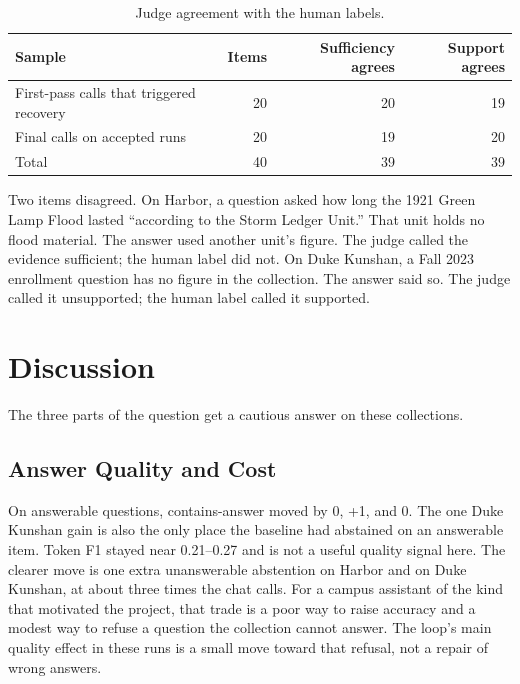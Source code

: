 \documentclass[12pt, a4paper, oneside]{report}
\begin{document}
\begin{table}[htbp]
\centering
\footnotesize
\begin{tabular}{@{}lrrr@{}}
\toprule
Sample & Items & Sufficiency agrees & Support agrees \\
\midrule
First-pass calls that triggered recovery & 20 & 20 & 19 \\
Final calls on accepted runs & 20 & 19 & 20 \\
\midrule
Total & 40 & 39 & 39 \\
\bottomrule
\end{tabular}
\caption{Judge agreement with the human labels.}
\label{tbl:judge}
\end{table}

Two items disagreed. On Harbor, a question asked how long the 1921 Green
Lamp Flood lasted ``according to the Storm Ledger Unit.'' That unit holds
no flood material. The answer used another unit's figure. The judge
called the evidence sufficient; the human label did not. On Duke Kunshan,
a Fall 2023 enrollment question has no figure in the collection. The
answer said so. The judge called it unsupported; the human label called
it supported.


\chapter{Discussion}
\label{discussion}

The three parts of the question get a cautious answer on these
collections.

\section{Answer Quality and Cost}

On answerable questions, contains-answer moved by 0, +1, and 0. The one
Duke Kunshan gain is also the only place the baseline had abstained on an
answerable item. Token F1 stayed near 0.21--0.27 and is not a useful
quality signal here. The clearer move is one extra unanswerable
abstention on Harbor and on Duke Kunshan, at about three times the chat
calls. For a campus assistant of the kind that motivated the project,
that trade is a poor way to raise accuracy and a modest way to refuse a
question the collection cannot answer. The loop's main quality effect in
these runs is a small move toward that refusal, not a repair of wrong
answers.
\end{document}
